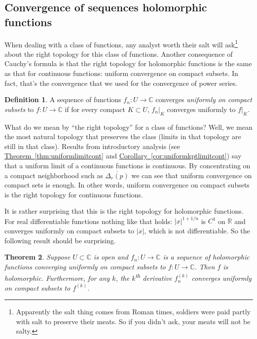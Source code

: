 \documentclass[12pt,openany]{book}
\newcommand{\sabs}[1]{\lvert {#1} \rvert}
\newcommand{\C}{{\mathbb{C}}}
\newcommand{\R}{{\mathbb{R}}}
\newcommand{\myindex}[1]{#1\index{#1}}
\theoremstyle{plain}
\newtheorem{thm}{Theorem}[section]
\theoremstyle{remark}
\theoremstyle{definition}
\newtheorem{defn}[thm]{Definition}
\theoremstyle{exercise}
\theoremstyle{example}
\newcommand{\thmref}[1]{\hyperref[#1]{Theorem~\ref*{#1}}}
\newcommand{\corref}[1]{\hyperref[#1]{Corollary~\ref*{#1}}}
\begin{document}
\subsection{Convergence of sequences holomorphic functions}

When dealing with a class of functions, any analyst worth their
salt will ask\footnote{Apparently the salt thing
comes from Roman times, soldiers were
paid partly with salt to preserve their meats.  So if you didn't ask,
your meats will not be salty.} about the right topology for this class of
functions.
Another consequence of Cauchy's formula is that the right topology for
holomorphic functions is the same as that for continuous functions: uniform
convergence on compact subsets.  In fact, that's the convergence that we
used for the convergence of power series.

\begin{defn}
A sequence of functions $f_n \colon U \to \C$ converges
\emph{\myindex{uniformly on compact subsets}}%
to $f \colon U \to \C$ if for every compact $K \subset U$,
$f_n|_K$ converges uniformly to $f|_K$.
\end{defn}

What do we mean by ``the right topology'' for a class of functions?
Well, we mean the most natural
topology that preserves the class (limits in that topology are still in that
class).  
Results from introductory analysis
(see \thmref{thm:uniformlimitcont} and \corref{cor:uniformkptlimitcont})
say that a uniform limit of a continuous functions is continuous.
By concentrating on a compact neighborhood such as $\overline{\Delta_r(p)}$
we can see that uniform convergence on compact sets is enough.
In other words, uniform convergence on compact subsets is the right topology
for continuous functions.

It is rather surprising that this is the right topology for holomorphic
functions.  For real
differentiable functions nothing like that holds: $\sabs{x}^{1+1/n}$
is $C^1$ on $\R$ and converges uniformly on compact subsets to $\sabs{x}$,
which is not differentiable.
So the following result should be surprising.

\begin{thm} \label{thm:unifoncompact}
Suppose $U \subset \C$ is open and $f_n \colon U \to \C$ is a sequence
of holomorphic functions converging uniformly on compact subsets to
$f \colon U \to \C$.  Then $f$ is holomorphic.
Furthermore, for any $k$, the $k$\textsuperscript{th} derivative
$f_n^{(k)}$ converges uniformly on compact subsets to $f^{(k)}$.
\end{thm}
\end{document}
